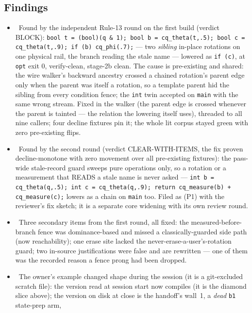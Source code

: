 \subsection*{Findings}
\begin{itemize}
  \item \fconfirmed\ Found by the independent Rule-13 round on the first build (verdict BLOCK):
    \texttt{bool t = (bool)(q \& 1); bool b = cq\_theta(t,.5); bool c = cq\_theta(t,.9); if (b) cq\_phi(.7);}
    --- two \emph{sibling} in-place rotations on one physical rail, the branch reading the stale
    name --- lowered as \texttt{if (c)}, at \texttt{opt} exit 0, verify-clean, stage-2b clean. The
    cause is pre-existing and shared: the wire walker's backward ancestry crossed a chained
    rotation's parent edge only when the parent was itself a rotation, so a template parent hid
    the sibling from every condition fence; the \texttt{int} twin accepted on \texttt{main} with the
    same wrong stream. Fixed in the walker (the parent edge is crossed whenever the parent is
    tainted --- the relation the lowering itself uses), threaded to all nine callers; four decline
    fixtures pin it; the whole lit corpus stayed green with zero pre-existing flips.
  \item \fpreexisting\ Found by the second round (verdict CLEAR-WITH-ITEMS, the fix proven
    decline-monotone with zero movement over all pre-existing fixtures): the pass-wide stale-record
    guard sweeps pure operations only, so a rotation or a measurement that READS a stale name is never
    asked --- \texttt{int b = cq\_theta(q,.5); int c = cq\_theta(q,.9); return cq\_measure(b) + cq\_measure(c);}
    lowers as a chain on \texttt{main} too. Filed as  (P1) with the reviewer's fix sketch; it is a
    separate core widening with its own review round.
  \item \fdoc\ Three secondary items from the first round, all fixed: the measured-before-branch fence
    was dominance-based and missed a classically-guarded side path (now reachability); one erase
    site lacked the never-erase-a-user's-rotation guard; two in-source justifications were false
    and are rewritten --- one of them was the recorded reason a fence prong had been dropped.
  \item \fdoc\ The owner's example changed shape during the session (it is a git-excluded scratch
    file): the version read at session start now compiles (it is the diamond slice above); the
    version on disk at close is the handoff's wall~1, a \emph{dead} \texttt{b1} state-prep arm,

\end{itemize}
